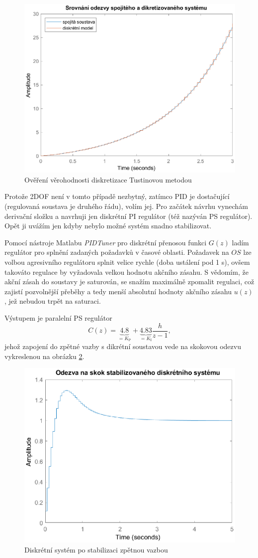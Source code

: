 \documentclass[twoside]{article}
\begin{document}
\begin{figure}[htbp]
	\centering
	\includegraphics[width=.8\linewidth]{porovnani_nestabilni.eps}
	\caption{Ověření věrohodnosti diskretizace Tustinovou metodou}
	\label{fig:porovnani}
\end{figure}

Protože 2DOF není v tomto případě nezbytný, zatímco PID je dostačující (regulovaná soustava je druhého řádu), volím jej.
Pro začátek návrhu vynechám derivační složku a navrhuji jen diskrétní PI regulátor (též nazýván PS regulátor).
Opět ji uvážím jen kdyby nebylo možné systém snadno stabilizovat.

Pomocí nástroje Matlabu \textit{PIDTuner} pro diskrétní přenosou funkci $G(z)$ ladím regulátor pro splnění zadaných
požadavků v časové oblasti. Požadavek na $OS$ lze volbou agresivního regulátoru splnit velice rychle (doba ustálení pod 1 \si{\second}),
ovšem takováto regulace by vyžadovala velkou hodnotu akčního zásahu. S vědomím, že akční zásah do soustavy je saturován, se snažím
maximálně zpomalit regulaci, což zajistí pozvolnější přeběhy a tedy menší absolutní hodnoty akčního zásahu $u(z)$, jež nebudou trpět na saturaci. 


Výstupem je paralelní PS regulátor
\begin{equation}
	C(z) = \underbrace{4.8}_{=K_\text{P}} + \underbrace{4.83}_{=K_\text{I}} \frac{h}{z-1},
\end{equation}
jehož zapojení do zpětné vazby s dikrétní soustavou vede na skokovou odezvu vykreslenou na obrázku \ref{fig:stabilizace}.

\begin{figure}[htbp]
	\centering
	\includegraphics[width=.6\linewidth]{stabilizovany_diskretni.eps}
	\caption{Diskrétní systém po stabilizaci zpětnou vazbou}
	\label{fig:stabilizace}
\end{figure}
\end{document}

